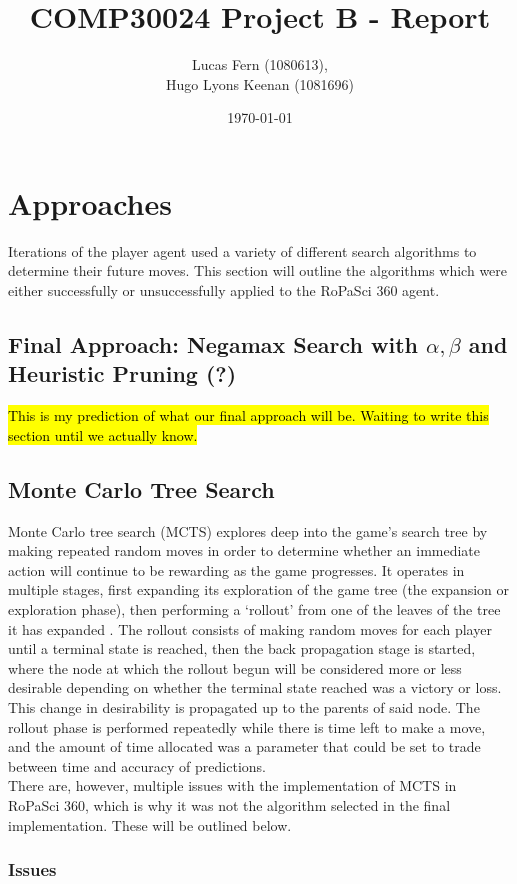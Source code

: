 \documentclass{article}
\title{COMP30024 Project B - Report}
\date{\today}
\author{Lucas Fern (1080613),\\Hugo Lyons Keenan (1081696)}
\begin{document}
\maketitle
\tableofcontents
\section{Approaches}
Iterations of the player agent used a variety of different search algorithms to determine their future moves. This section will outline the algorithms which were either successfully or unsuccessfully applied to the RoPaSci 360 agent.
\subsection{Final Approach: Negamax Search with $\alpha, \beta$ and Heuristic Pruning (?)}
\hl{This is my prediction of what our final approach will be. Waiting to write this section until we actually know.}
\subsection{Monte Carlo Tree Search}
Monte Carlo tree search (MCTS) explores deep into the game's search tree by making repeated random moves in order to determine whether an immediate action will continue to be rewarding as the game progresses. It operates in multiple stages, first expanding its exploration of the game tree (the expansion or exploration phase), then performing a `rollout' from one of the leaves of the tree it has expanded \cite{YT-MCTS}. The rollout consists of making random moves for each player until a terminal state is reached, then the back propagation stage is started, where the node at which the rollout begun will be considered more or less desirable depending on whether the terminal state reached was a victory or loss. This change in desirability is propagated up to the parents of said node. The rollout phase is performed repeatedly while there is time left to make a move, and the amount of time allocated was a parameter that could be set to trade between time and accuracy of predictions.\\[2mm]
There are, however, multiple issues with the implementation of MCTS in RoPaSci 360, which is why it was not the algorithm selected in the final implementation. These will be outlined below.
\subsubsection{Issues}
\end{document}
